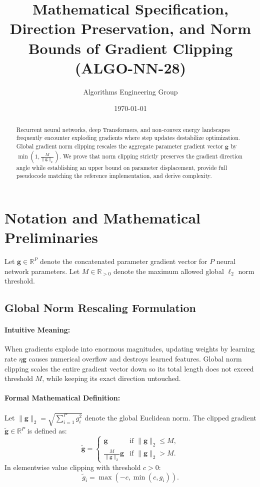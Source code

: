 \documentclass[11pt]{article}
\title{\textbf{Mathematical Specification, Direction Preservation, and Norm Bounds of Gradient Clipping (ALGO-NN-28)}}
\author{Algorithms Engineering Group}
\date{\today}
\begin{document}
\maketitle

\begin{abstract}
Recurrent neural networks, deep Transformers, and non-convex energy landscapes frequently encounter exploding gradients where step updates destabilize optimization. Global gradient norm clipping rescales the aggregate parameter gradient vector $\mathbf{g}$ by $\min\left(1, \frac{M}{\|\mathbf{g}\|_2}\right)$. We prove that norm clipping strictly preserves the gradient direction angle while establishing an upper bound on parameter displacement, provide full pseudocode matching the reference implementation, and derive complexity.
\end{abstract}

\section{Notation and Mathematical Preliminaries}
\label{sec:notation}

Let $\mathbf{g} \in \mathbb{R}^P$ denote the concatenated parameter gradient vector for $P$ neural network parameters. Let $M \in \mathbb{R}_{>0}$ denote the maximum allowed global $\ell_2$ norm threshold.

\subsection{Global Norm Rescaling Formulation}
\paragraph{Intuitive Meaning:} When gradients explode into enormous magnitudes, updating weights by learning rate $\eta \mathbf{g}$ causes numerical overflow and destroys learned features. Global norm clipping scales the entire gradient vector down so its total length does not exceed threshold $M$, while keeping its exact direction untouched.

\paragraph{Formal Mathematical Definition:}
Let $\|\mathbf{g}\|_2 = \sqrt{\sum_{i=1}^P g_i^2}$ denote the global Euclidean norm.
The clipped gradient $\tilde{\mathbf{g}} \in \mathbb{R}^P$ is defined as:
\begin{equation}
\label{eq:norm_clipping}
\tilde{\mathbf{g}} = \begin{cases} \mathbf{g} & \text{if } \|\mathbf{g}\|_2 \le M, \\ \frac{M}{\|\mathbf{g}\|_2} \mathbf{g} & \text{if } \|\mathbf{g}\|_2 > M. \end{cases}
\end{equation}
In elementwise value clipping with threshold $c > 0$:
\begin{equation}
\label{eq:value_clipping}
\tilde{g}_i = \max(-c, \min(c, g_i)).
\end{equation}
\end{document}
